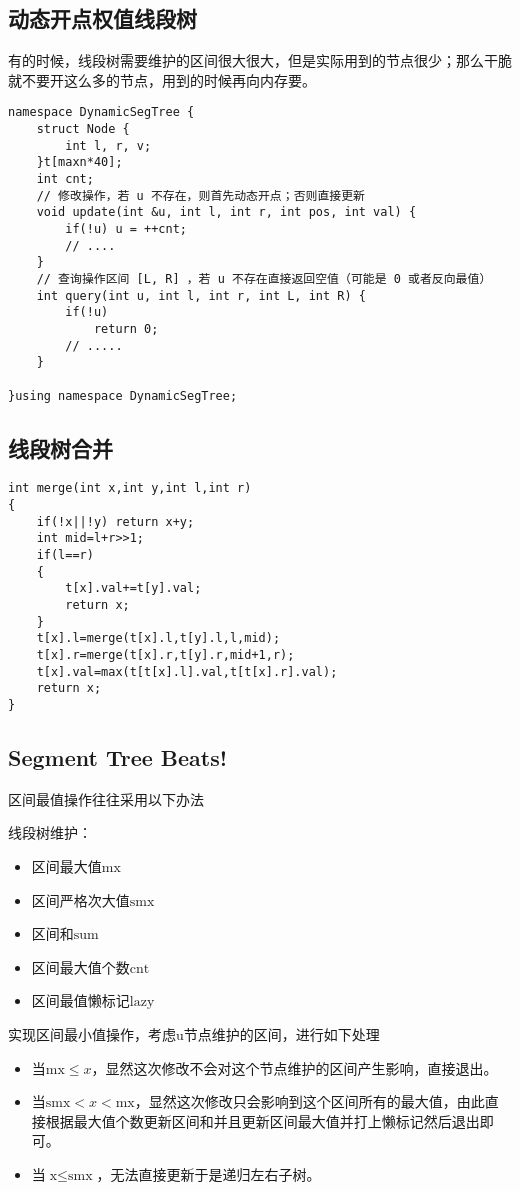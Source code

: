 \subsection{动态开点权值线段树}
\par \noindent 有的时候，线段树需要维护的区间很大很大，但是实际用到的节点很少；那么干脆就不要开这么多的节点，用到的时候再向内存要。

\begin{verbatim}
namespace DynamicSegTree {
    struct Node {
        int l, r, v;
    }t[maxn*40];
    int cnt;
    // 修改操作，若 u 不存在，则首先动态开点；否则直接更新
    void update(int &u, int l, int r, int pos, int val) {
        if(!u) u = ++cnt;
        // ....
    }
    // 查询操作区间 [L, R] ，若 u 不存在直接返回空值（可能是 0 或者反向最值）
    int query(int u, int l, int r, int L, int R) {
        if(!u) 
            return 0;
        // .....
    }

}using namespace DynamicSegTree;
\end{verbatim}
\subsection{线段树合并}
\begin{verbatim}
int merge(int x,int y,int l,int r)
{
    if(!x||!y) return x+y;
    int mid=l+r>>1;
    if(l==r)
    {
        t[x].val+=t[y].val;
        return x;
    }
    t[x].l=merge(t[x].l,t[y].l,l,mid);
    t[x].r=merge(t[x].r,t[y].r,mid+1,r);
    t[x].val=max(t[t[x].l].val,t[t[x].r].val);
    return x;
}
\end{verbatim}

\subsection{Segment Tree Beats!}
\par \noindent 区间最值操作往往采用以下办法 

\par \noindent 线段树维护：
\begin{itemize}
\item 区间最大值$\text{mx}$  
\item 区间严格次大值$\text {smx}$  
\item 区间和$\text{sum}$ 
\item 区间最大值个数$\text{cnt}$  
\item 区间最值懒标记$\text{lazy}$
\end{itemize}
\par \noindent 实现区间最小值操作，考虑u节点维护的区间，进行如下处理
\begin{itemize}
\item 当$\text{mx}\leq x$，显然这次修改不会对这个节点维护的区间产生影响，直接退出。
\item 当$\text{smx}<x<\text{mx}$，显然这次修改只会影响到这个区间所有的最大值，由此直接根据最大值个数更新区间和并且更新区间最大值并打上懒标记然后退出即可。
\item 当$\text{x}\leq \text{smx}$，无法直接更新于是递归左右子树。
\end{itemize}

